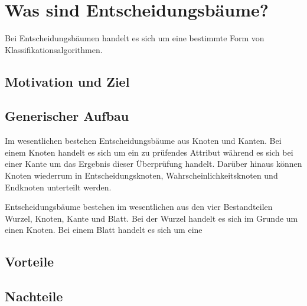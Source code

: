 \chapter{Was sind Entscheidungsbäume?}
\label{eb:was-sind-entscheidungsbaeume}

Bei Entscheidungsbäumen handelt es sich um eine bestimmte Form von Klassifikationsalgorithmen. 

\section{Motivation und Ziel}
\label{eb:motivation}

\section{Generischer Aufbau}
\label{eb:aufbau}
Im wesentlichen bestehen Entscheidungsbäume aus Knoten und Kanten. Bei einem Knoten handelt es sich um ein zu prüfendes Attribut während es sich bei einer Kante um das Ergebnis dieser Überprüfung handelt. \autocite{DataMining} Darüber hinaus können Knoten wiederrum in Entscheidungsknoten, Wahrscheinlichkeitsknoten und Endknoten unterteilt werden.

Entscheidungsbäume bestehen im wesentlichen aus den vier Bestandteilen Wurzel, Knoten, Kante und Blatt. Bei der Wurzel handelt es sich im Grunde um einen Knoten. 
Bei einem Blatt handelt es sich um eine

\section{Vorteile}
\label{eb:vorteile}

\section{Nachteile}
\label{eb:nachteile}